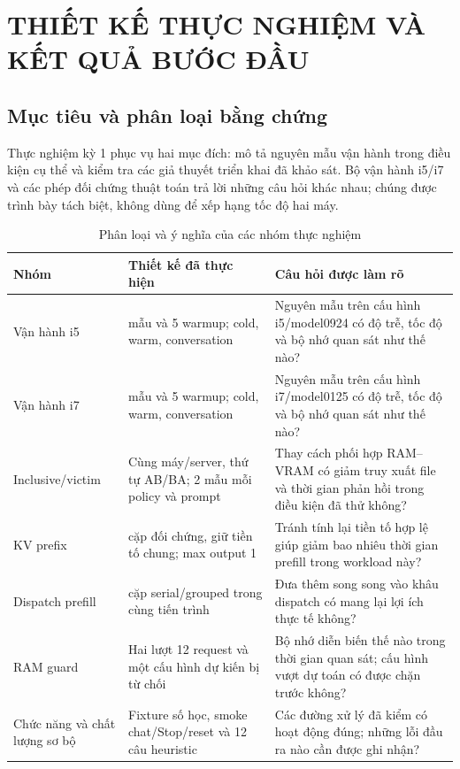 \chapter{THIẾT KẾ THỰC NGHIỆM VÀ KẾT QUẢ BƯỚC ĐẦU}


\section{Mục tiêu và phân loại bằng chứng}

Thực nghiệm kỳ 1 phục vụ hai mục đích: mô tả nguyên mẫu vận hành trong điều kiện cụ thể và kiểm tra các giả thuyết triển khai đã khảo sát. Bộ vận hành i5/i7 và các phép đối chứng thuật toán trả lời những câu hỏi khác nhau; chúng được trình bày tách biệt, không dùng để xếp hạng tốc độ hai máy.

\begin{table}[htbp]
\centering
\caption{Phân loại và ý nghĩa của các nhóm thực nghiệm}
\small
\setlength{\tabcolsep}{3pt}
\begin{tabularx}{\textwidth}{>{\RaggedRight\arraybackslash}p{3.5cm} >{\RaggedRight\arraybackslash}p{4cm} >{\RaggedRight\arraybackslash}X}
\toprule
\textbf{Nhóm} & \textbf{Thiết kế đã thực hiện} & \textbf{Câu hỏi được làm rõ} \\
\midrule
Vận hành i5 & 20 mẫu và 5 warmup; cold, warm, conversation & Nguyên mẫu trên cấu hình i5/model0924 có độ trễ, tốc độ và bộ nhớ quan sát như thế nào? \\
Vận hành i7 & 20 mẫu và 5 warmup; cold, warm, conversation & Nguyên mẫu trên cấu hình i7/model0125 có độ trễ, tốc độ và bộ nhớ quan sát như thế nào? \\
Inclusive/victim & Cùng máy/server, thứ tự AB/BA; 2 mẫu mỗi policy và prompt & Thay cách phối hợp RAM–VRAM có giảm truy xuất file và thời gian phản hồi trong điều kiện đã thử không? \\
KV prefix & 5 cặp đối chứng, giữ tiền tố chung; max output 1 & Tránh tính lại tiền tố hợp lệ giúp giảm bao nhiêu thời gian prefill trong workload này? \\
Dispatch prefill & 9 cặp serial/grouped trong cùng tiến trình & Đưa thêm song song vào khâu dispatch có mang lại lợi ích thực tế không? \\
RAM guard & Hai lượt 12 request và một cấu hình dự kiến bị từ chối & Bộ nhớ diễn biến thế nào trong thời gian quan sát; cấu hình vượt dự toán có được chặn trước không? \\
Chức năng và chất lượng sơ bộ & Fixture số học, smoke chat/Stop/reset và 12 câu heuristic & Các đường xử lý đã kiểm có hoạt động đúng; những lỗi đầu ra nào cần được ghi nhận? \\
\bottomrule
\end{tabularx}


\end{table}




